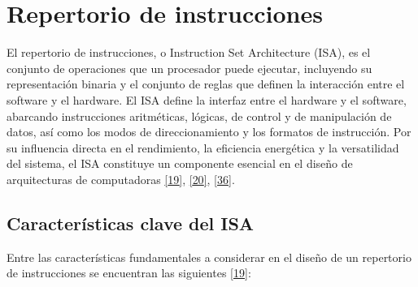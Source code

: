 \documentclass[12pt,oneside]{templates/unerthesis}
\begin{document}
\hypertarget{repertorio-de-instrucciones}{%
\section{Repertorio de instrucciones}\label{repertorio-de-instrucciones}}

El repertorio de instrucciones, o Instruction Set Architecture (ISA), es el conjunto de operaciones que un procesador puede ejecutar, incluyendo su representación binaria y el conjunto de reglas que definen la interacción entre el software y el hardware. El ISA define la interfaz entre el hardware y el software, abarcando instrucciones aritméticas, lógicas, de control y de manipulación de datos, así como los modos de direccionamiento y los formatos de instrucción. Por su influencia directa en el rendimiento, la eficiencia energética y la versatilidad del sistema, el ISA constituye un componente esencial en el diseño de arquitecturas de computadoras \protect\hyperlink{ref-hennessy2017computer}{{[}19{]}}, \protect\hyperlink{ref-stallings_computer_2021}{{[}20{]}}, \protect\hyperlink{ref-null_essentials_2023}{{[}36{]}}.

\hypertarget{caracteruxedsticas-clave-del-isa}{%
\subsection{Características clave del ISA}\label{caracteruxedsticas-clave-del-isa}}

Entre las características fundamentales a considerar en el diseño de un repertorio de instrucciones se encuentran las siguientes \protect\hyperlink{ref-hennessy2017computer}{{[}19{]}}:
\end{document}
